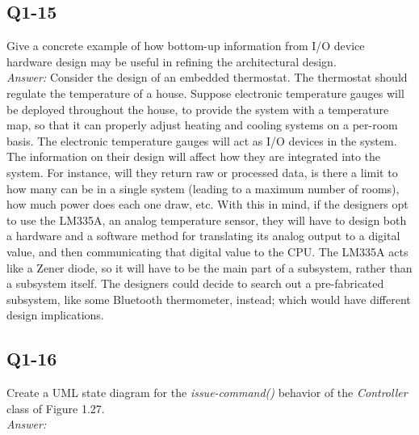 \documentclass{article}
\begin{document}
\subsection*{ Q1-15 }%
Give a concrete example of how bottom-up information from I/O device hardware design may be useful in refining the architectural design. 
\\
\emph{Answer:}
Consider the design of an embedded thermostat. The thermostat should regulate the temperature of a house. Suppose electronic temperature gauges will be deployed throughout the house, to provide the system with a temperature map, so that it can properly adjust heating and cooling systems on a per-room basis. The electronic temperature gauges will act as I/O devices in the system. The information on their design will affect how they are integrated into the system. For instance, will they return raw or processed data, is there a limit to how many can be in a single system (leading to a maximum number of rooms), how much power does each one draw, etc. With this in mind, if the designers opt to use the LM335A, an analog temperature sensor, they will have to design both a hardware and a software method for translating its analog output to a digital value, and then communicating that digital value to the CPU. The LM335A acts like a Zener diode, so it will have to be the main part of a subsystem, rather than a subsystem itself. The designers could decide to search out a pre-fabricated subsystem, like some Bluetooth thermometer, instead; which would have different design implications. 

\newpage
\subsection*{ Q1-16 }%
Create a UML state diagram for the \emph{issue-command()} behavior of the \emph{Controller} class of Figure 1.27.
\\
\emph{Answer:}\\
\end{document}
